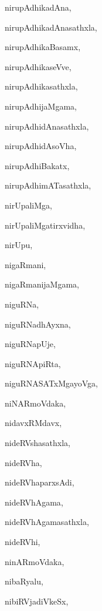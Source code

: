 \begin{multicols}{2}
{nirupAdhikadAna}, \pageref{nirupAdhikadAna}

{nirupAdhikadAnasathxla}, \pageref{nirupAdhikadAnasathxla}

{nirupAdhikaBasamx}, \pageref{nirupAdhikaBasamx}

{nirupAdhikaseVve}, \pageref{nirupAdhikaseVve}

{nirupAdhikasathxla}, \pageref{nirupAdhikasathxla}

{nirupAdhijaMgama}, \pageref{nirupAdhijaMgama}

{nirupAdhidAnasathxla}, \pageref{nirupAdhidAnasathxla}

{nirupAdhidAsoVha}, \pageref{nirupAdhidAsoVha}

{nirupAdhiBakatx}, \pageref{nirupAdhiBakatx}

{nirupAdhimATasathxla}, \pageref{nirupAdhimATasathxla}

{nirUpaliMga}, \pageref{nirUpaliMga}

{nirUpaliMgatirxvidha}, \pageref{nirUpaliMgatirxvidha}

{nirUpu}, \pageref{nirUpu}

{nigaRmani}, \pageref{nigaRmani}

{nigaRmanijaMgama}, \pageref{nigaRmanijaMgama}

{niguRNa}, \pageref{niguRNa}

{niguRNadhAyxna}, \pageref{niguRNadhAyxna}

{niguRNapUje}, \pageref{niguRNapUje}

{niguRNApiRta}, \pageref{niguRNApiRta}

{niguRNASATxMgayoVga}, \pageref{niguRNASATxMgayoVga}

{niNARmoVdaka}, \pageref{niNARmoVdaka}

{nidavxRMdavx}, \pageref{nidavxRMdavx}

{nideRVshasathxla}, \pageref{nideRVshasathxla}

{nideRVha}, \pageref{nideRVha}

{nideRVhaparxsAdi}, \pageref{nideRVhaparxsAdi}

{nideRVhAgama}, \pageref{nideRVhAgama}

{nideRVhAgamasathxla}, \pageref{nideRVhAgamasathxla}

{nideRVhi}, \pageref{nideRVhi}

{ninARmoVdaka}, \pageref{ninARmoVdaka}

{nibaRyalu}, \pageref{nibaRyalu}

{nibiRVjadiVkeSx}, \pageref{nibiRVjadiVkeSx}


\end{multicols}
